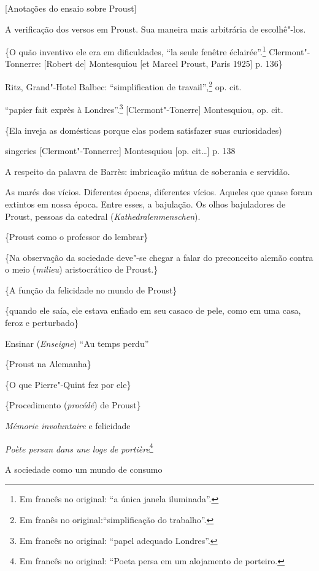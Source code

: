 {[}Anotações do ensaio sobre Proust{]}

A verificação dos versos em Proust. Sua maneira mais arbitrária de
escolhê"-los.

\{O quão inventivo ele era em dificuldades, ``la seule fenêtre
éclairée''.\footnote{Em francês no original: ``a única janela iluminada''. \versal{[N. T.]}}
Clermont"-Tonnerre: {[}Robert de{]} Montesquiou {[}et Marcel Proust,
Paris 1925{]} p. 136\}

Ritz, Grand"-Hotel Balbec: ``simplification de travail'',\footnote{Em franês no original:``simplificação do trabalho''. \versal{[N. T.]}} op. cit.

``papier fait exprès à Londres''.\footnote{Em francês no original: ``papel adequado
  Londres''. \versal{[N. T.]}} {[}Clermont"-Tonerre{]} Montesquiou, op. cit.

\{Ela inveja as domésticas porque elas podem satisfazer suas
curiosidades)

singeries {[}Clermont"-Tonnerre:{]} Montesquiou {[}op. cit\ldots{}{]} p. 138

A respeito da palavra de Barrès: imbricação mútua de soberania e
servidão.

As marés dos vícios. Diferentes épocas, diferentes vícios. Aqueles que
quase foram extintos em nossa época. Entre esses, a bajulação. Os olhos
bajuladores de Proust, pessoas da catedral (\emph{Kathedralenmenschen}).

\{Proust como o professor do lembrar\}

\{Na observação da sociedade deve"-se chegar a falar do preconceito
alemão contra o meio (\emph{milieu}) aristocrático de Proust.\}

\{A função da felicidade no mundo de Proust\}

\{quando ele saía, ele estava enfiado em seu casaco de pele, como em uma
casa, feroz e perturbado\}

Ensinar (\emph{Enseigne}) ``Au temps perdu''

\{Proust na Alemanha\}

\{O que Pierre"-Quint fez por ele\}

\{Procedimento (\emph{procédé}) de Proust\}

\emph{Mémorie involuntaire} e felicidade

\emph{Poète persan dans une loge de portière}\footnote{Em francês no original: ``Poeta
  persa em um alojamento de porteiro. \versal{[N. T.]}}

A sociedade como um mundo de consumo

